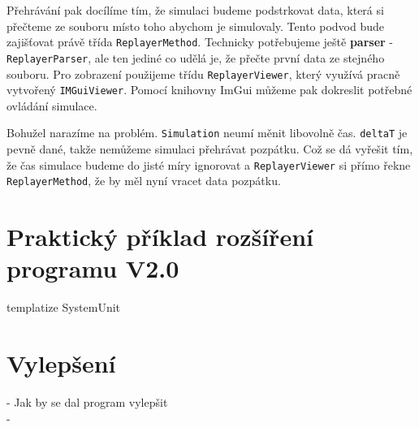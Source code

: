Přehrávání pak docílíme tím, že simulaci budeme podstrkovat data, která si přečteme ze souboru místo toho abychom je simulovaly. Tento podvod bude zajišťovat právě třída \texttt{ReplayerMethod}. Technicky potřebujeme ještě \textbf{parser} - \texttt{ReplayerParser}, ale ten jediné co udělá je, že přečte první data ze stejného souboru. Pro zobrazení použijeme třídu \texttt{ReplayerViewer}, který využívá pracně vytvořený \texttt{IMGuiViewer}. Pomocí knihovny ImGui můžeme pak dokreslit potřebné ovládání simulace.

Bohužel narazíme na problém. \texttt{Simulation} neumí měnit libovolně čas. \texttt{deltaT} je pevně dané, takže nemůžeme simulaci přehrávat pozpátku. Což se dá vyřešit tím, že čas simulace budeme do jisté míry ignorovat a \texttt{ReplayerViewer} si přímo řekne \texttt{ReplayerMethod}, že by měl nyní vracet data pozpátku.
\section{Praktický příklad rozšíření programu V2.0}
\label{sec:extV2}
templatize SystemUnit
\section{Vylepšení}
- Jak by se dal program vylepšit\\
	- 
